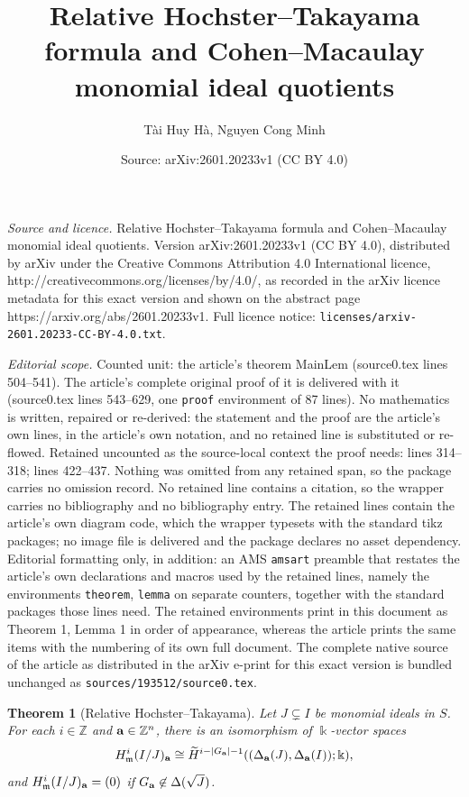 \documentclass[10pt,a4paper]{amsart}
\title{Relative Hochster--Takayama formula and Cohen--Macaulay monomial ideal quotients}
\author{T\`ai Huy H\`a, Nguyen Cong Minh}
\date{Source: arXiv:2601.20233v1 (CC BY 4.0)}
\newtheorem{theorem}{Theorem}
\newcommand{\ZZ}{{\mathbb Z}}
\def\a{{\bold a}}
\def\kk{{\Bbbk}}
\def\mm{{\mathfrak m}}
\begin{document}
\maketitle

\noindent\emph{Source and licence.} Relative Hochster--Takayama formula and Cohen--Macaulay monomial ideal quotients. Version arXiv:2601.20233v1 (CC BY 4.0), distributed by arXiv under the Creative Commons Attribution 4.0 International licence, http://creativecommons.org/licenses/by/4.0/, as recorded in the arXiv licence metadata for this exact version and shown on the abstract page https://arxiv.org/abs/2601.20233v1. Full licence notice: \texttt{licenses/arxiv-2601.20233-CC-BY-4.0.txt}.\par\smallskip

\noindent\textit{Editorial scope.} Counted unit: the article's theorem MainLem (source0.tex lines 504--541). The article's complete original proof of it is delivered with it (source0.tex lines 543--629, one \texttt{proof} environment of 87 lines). No mathematics is written, repaired or re-derived: the statement and the proof are the article's own lines, in the article's own notation, and no retained line is substituted or re-flowed.  Retained uncounted as the source-local context the proof needs: lines 314--318; lines 422--437.  Nothing was omitted from any retained span, so the package carries no omission record.  No retained line contains a citation, so the wrapper carries no bibliography and no bibliography entry.  The retained lines contain the article's own diagram code, which the wrapper typesets with the standard tikz packages; no image file is delivered and the package declares no asset dependency.  Editorial formatting only, in addition: an AMS \texttt{amsart} preamble that restates the article's own declarations and macros used by the retained lines, namely the environments \texttt{theorem}, \texttt{lemma} on separate counters, together with the standard packages those lines need.  The retained environments print in this document as Theorem 1, Lemma 1 in order of appearance, whereas the article prints the same items with the numbering of its own full document.  The complete native source of the article as distributed in the arXiv e-print for this exact version is bundled unchanged as \texttt{sources/193512/source0.tex}.
\begin{theorem}[Relative Hochster--Takayama]\label{HochsterTakayama}
	Let $J\subsetneq I$ be monomial ideals in $S$. For each $i\in\ZZ$ and $\a\in\ZZ^n$, there is an isomorphism of $\kk$-vector spaces
	$$H_{\mm}^{i}(I/J)_{\a}\cong \widetilde{H}^{i-|G_\a|-1}((\Delta_\a(J),\Delta_\a(I)); \kk),$$
	and $H_{\mm}^{i}(I/J)_{\a}=(0)$ if $G_\a \not\in \Delta(\sqrt{J})$.
\end{theorem}
\end{document}
